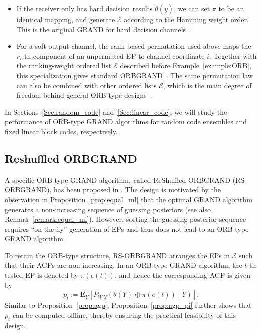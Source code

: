 \documentclass[letterpaper,draftclsnofoot,onecolumn]{IEEEtran}
\begin{document}
\begin{itemize}
    \item If the receiver only has hard decision results $\theta(\underline{y})$, we can set $\pi$ to be an identical mapping, and generate $\mathcal{E}$ according to the Hamming weight order. This is the original GRAND for hard decision channels \cite{duffy2019GRAND}. 
    \item For a soft-output channel, the rank-based permutation used above maps the $r_i$-th component of an unpermuted EP to channel coordinate $i$.
    Together with the ranking-weight ordered list $\mathcal{E}$ described before Example~\ref{example:ORB}, this specialization gives standard ORBGRAND~\cite{duffy2022ORBGRAND}.
    The same permutation law can also be combined with other ordered lists $\mathcal{E}$, which is the main degree of freedom behind general ORB-type designs~\cite{liu2022orbgrand, condo2021high}.
\end{itemize}

In Sections~\ref{Sec:random_code} and~\ref{Sec:linear_code}, we will study the performance of ORB-type GRAND algorithms for random code ensembles and fixed linear block codes, respectively.

\subsection{Reshuffled ORBGRAND}\label{SubSec:RS-ORB}

A specific ORB-type GRAND algorithm, called ReShuffled-ORBGRAND (RS-ORBGRAND), has been proposed in \cite{wan2024approaching}. 
The design is motivated by the observation in Proposition~\ref{prop:equal_ml} that the optimal GRAND algorithm generates a non-increasing sequence of guessing posteriors (see also Remark~\ref{remark:equal_ml}). However, sorting the guessing posterior sequence requires ``on-the-fly'' generation of EPs and thus does not lead to an ORB-type GRAND algorithm.

To retain the ORB-type structure, RS-ORBGRAND arranges the EPs in $\mathcal{E}$ such that their AGPs are non-increasing. In an ORB-type GRAND algorithm, the $t$-th tested EP is denoted by $\pi(\underline{e}(t))$, and hence the corresponding AGP is given by
\begin{equation}\label{eq:orb_type_agp_def}
    p_t := \mathbf{E}_{\underline{Y}} \left[P_{\underline{W}|\underline{Y}}(\theta(\underline{Y})\oplus \pi(\underline{e}(t)) \mid \underline{Y})\right].
\end{equation}
Similar to Proposition~\ref{prop:agp}, Proposition~\ref{prop:agp_pi} further shows that $p_t$ can be computed offline, thereby ensuring the practical feasibility of this design.
\end{document}
